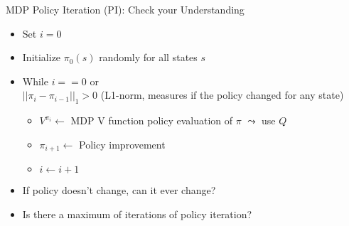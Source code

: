 \begin{frame}[c]{MDP Policy Iteration (PI): Check your Understanding}

\begin{itemize}
	\item Set $i=0$
	\item Initialize $\pi_0(s)$ randomly for all states $s$
	\item While $i == 0$ or\\ $||\pi_i - \pi_{i-1}||_1 > 0$ (L1-norm, measures if the policy changed for any state)
	\begin{itemize}
		\item $V^{\pi_i} \gets$ MDP V function policy \alert{evaluation} of $\pi$ \hspace{1em} $\leadsto$ use $Q$
		\item $\pi_{i+1} \gets$ Policy \alert{improvement}
		\item $i \gets i+1$
	\end{itemize}
	\item \alert{If policy doesn't change, can it ever change?}
	\item \alert{Is there a maximum of iterations of policy iteration?}
\end{itemize}

\end{frame}



